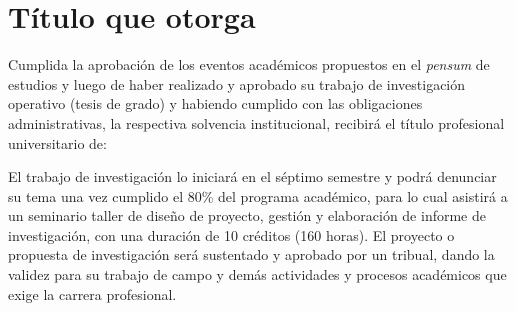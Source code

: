 \section{Título que otorga}\label{sec:cs-grados-y-titulos}
Cumplida la aprobación de los eventos académicos propuestos en el \textit{pensum} 
de estudios y luego de haber realizado y aprobado su trabajo de investigación 
operativo (tesis de grado) y habiendo cumplido con las obligaciones 
administrativas, la respectiva solvencia  institucional, 
recibirá el título profesional universitario de:

\AcademicDegreeAndTitle

El trabajo de investigación lo iniciará en el séptimo semestre y podrá 
denunciar su tema una vez cumplido el 80\% del programa académico, 
para  lo cual asistirá a un seminario taller de diseño de proyecto, 
gestión y elaboración de informe de investigación, con una duración de 
10 créditos (160 horas). El proyecto o propuesta de investigación 
será sustentado y aprobado por un tribual, dando la validez para su 
trabajo de campo y demás actividades y procesos académicos que exige 
la carrera profesional. 